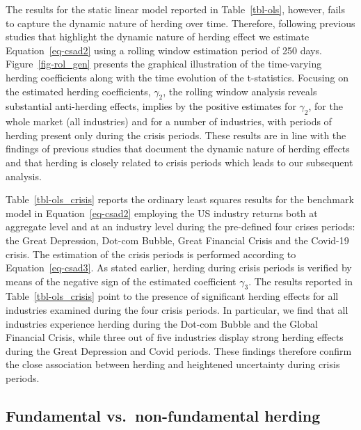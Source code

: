 \documentclass[
  letterpaper,
  DIV=11,
  numbers=noendperiod]{scrartcl}
\begin{document}
The results for the static linear model reported in Table~\ref{tbl-ols},
however, fails to capture the dynamic nature of herding over time.
Therefore, following previous studies that highlight the dynamic nature
of herding effect
\citep{babalos2015commodity, klein2013time, mohamad2022birds} we
estimate Equation~\ref{eq-csad2} using a rolling window estimation
period of 250 days. Figure~\ref{fig-rol_gen} presents the graphical
illustration of the time-varying herding coefficients along with the
time evolution of the t-statistics. Focusing on the estimated herding
coefficients, \(\gamma_2\), the rolling window analysis reveals
substantial anti-herding effects, implies by the positive estimates for
\(\gamma_2\), for the whole market (all industries) and for a number of
industries, with periods of herding present only during the crisis
periods. These results are in line with the findings of previous studies
that document the dynamic nature of herding effects and that herding is
closely related to crisis periods which leads to our subsequent
analysis.

Table~\ref{tbl-ols_crisis} reports the ordinary least squares results
for the benchmark model in Equation~\ref{eq-csad2} employing the US
industry returns both at aggregate level and at an industry level during
the pre-defined four crises periods: the Great Depression, Dot-com
Bubble, Great Financial Crisis and the Covid-19 crisis. The estimation
of the crisis periods is performed according to Equation~\ref{eq-csad3}.
As stated earlier, herding during crisis periods is verified by means of
the negative sign of the estimated coefficient \(\gamma_3\). The results
reported in Table~\ref{tbl-ols_crisis} point to the presence of
significant herding effects for all industries examined during the four
crisis periods. In particular, we find that all industries experience
herding during the Dot-com Bubble and the Global Financial Crisis, while
three out of five industries display strong herding effects during the
Great Depression and Covid periods. These findings therefore confirm the
close association between herding and heightened uncertainty during
crisis periods.

\subsection{Fundamental vs.~non-fundamental
herding}\label{fundamental-vs.-non-fundamental-herding}
\end{document}
